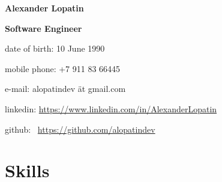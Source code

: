 \begin{center}
\fontsize{16pt}{10pt}\selectfont
\bfseries Alexander Lopatin\mdseries

\fontsize{12pt}{10pt}\selectfont
\bfseries Software Engineer\mdseries

\end{center}
{
\begin{flushright}
\fontsize{9pt}{8pt}\selectfont
\item date of birth: 10 June 1990
\item mobile phone: +7 911 83 66445
\item e-mail: alopatindev ät gmail.com
\item linkedin: \href{https://www.linkedin.com/in/AlexanderLopatin}{https://www.linkedin.com/in/AlexanderLopatin}
\item github: \
\href{https://github.com/alopatindev?tab=repositories}{https://github.com/alopatindev}
\end{flushright}
}

\fontsize{11pt}{12pt}\selectfont

\section{Skills}

